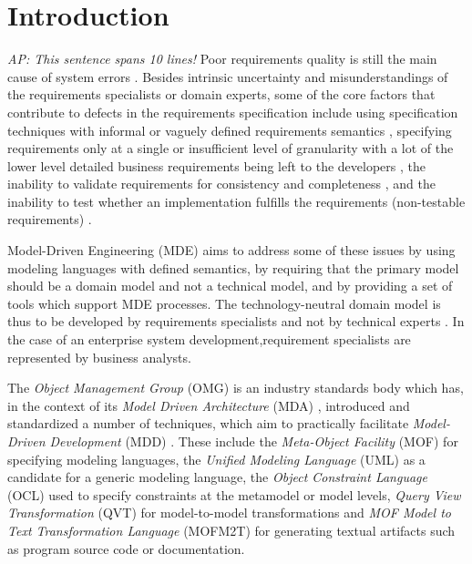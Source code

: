 \section{Introduction}


\emph{AP: This sentence spans 10 lines!}
Poor requirements quality is still the main cause of system errors \cite{heck_experiences_2008}. Besides intrinsic uncertainty and misunderstandings of the requirements specialists or domain experts, some of the core factors that contribute to defects in the requirements specification include using specification techniques with informal or vaguely defined requirements semantics \cite{ferguson_empirical_2006}, specifying requirements only at a single or insufficient level of granularity with a lot of the lower level detailed business requirements being left to the developers \cite{espana_evaluating_2009,getBetterReference}, the inability to validate requirements for consistency and completeness \cite{somebodyPleaseFindASuitableReference}, and the inability to test whether an implementation fulfills the requirements (non-testable requirements) \cite{bashardoust-tajali_extracting_2008}.

Model-Driven Engineering (MDE)  \cite{schmidt_model_2006} aims to address some of these issues by using modeling languages with defined semantics, by requiring that the primary model should be a domain model and not a technical model\cite{asnina_computation_2010}, and by providing a set of tools which support MDE processes. The technology-neutral domain model is thus to be developed by requirements specialists and not by technical experts \cite{asnina_computation_2010}. In the case of an enterprise system development,requirement specialists are represented by business analysts.

The {\em Object Management Group} (OMG) is an industry standards body which has, in the context of its {\em Model Driven Architecture} (MDA) \cite{siegel_developing_2001}, introduced and standardized a number of techniques, which aim to practically facilitate {\em Model-Driven Development} (MDD) \cite{}. These include the {\em Meta-Object Facility} (MOF)  \cite{} for specifying modeling languages, the {\em Unified Modeling Language} (UML) \cite{} as a candidate for a generic modeling language, the {\em Object Constraint Language} (OCL) used to specify constraints at the metamodel or model levels, {\em Query View Transformation} (QVT) for model-to-model transformations and {\em MOF Model to Text Transformation Language} (MOFM2T) for generating textual artifacts such as program source code or documentation. 

